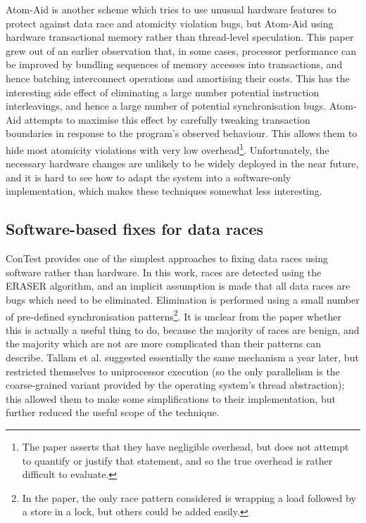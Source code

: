 Atom-Aid\cite{Lucia2009} is another scheme which tries to use unusual
hardware features to protect against data race and atomicity violation
bugs, but Atom-Aid using hardware transactional memory rather than
thread-level speculation.  This paper grew out of an earlier
observation that, in some cases, processor performance can be improved
by bundling sequences of memory accesses into transactions, and hence
batching interconnect operations and amortising their
costs\cite{Ceze2007}.  This has the interesting side effect of
eliminating a large number potential instruction interleavings, and
hence a large number of potential synchronisation bugs.  Atom-Aid
attempts to maximise this effect by carefully tweaking transaction
boundaries in response to the program's observed behaviour.  This
allows them to hide most atomicity violations with very low
overhead\footnote{The paper asserts that they have negligible
  overhead, but does not attempt to quantify or justify that
  statement, and so the true overhead is rather difficult to
  evaluate.}.  Unfortunately, the necessary hardware changes are
unlikely to be widely deployed in the near future, and it is hard to
see how to adapt the system into a software-only implementation, which
makes these techniques somewhat less interesting.

\subsection{Software-based fixes for data races}
ConTest\cite{Krena2007} provides one of the simplest approaches to
fixing data races using software rather than hardware.  In this work,
races are detected using the ERASER\cite{Savage1997} algorithm, and an
implicit assumption is made that all data races are bugs which need to
be eliminated.  Elimination is performed using a small number of
pre-defined synchronisation patterns\footnote{In the paper, the only
  race pattern considered is wrapping a load followed by a store in a
  lock, but others could be added easily.}.  It is unclear from the
paper whether this is actually a useful thing to do, because the
majority of races are benign, and the majority which are not are more
complicated than their patterns can describe.  Tallam et
al.\cite{Tallam2008} suggested essentially the same mechanism a year
later, but restricted themselves to uniprocessor execution (so the
only parallelism is the coarse-grained variant provided by the
operating system's thread abstraction); this allowed them to make some
simplifications to their implementation, but further reduced the
useful scope of the technique.

